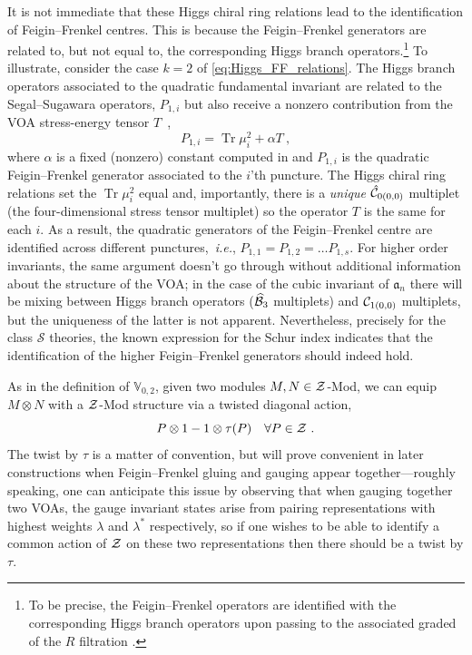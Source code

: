 \documentclass[a4paper]{article}
\def\IV{\mathbb{V}}
\def\BB{{\cal B}}
\def\CC{{\cal C}}
\def\ZZ{{\cal Z}}
\def\Tr{\mathop{\mathrm{Tr}}\nolimits}
\def\af{\mathfrak{a}}
\def \ie{{\it i.e.}}
\begin{document}
It is not immediate that these Higgs chiral ring relations lead to the identification of Feigin--Frenkel centres. This is because the Feigin--Frenkel generators are related to, but not equal to, the corresponding Higgs branch operators.\footnote{To be precise, the Feigin--Frenkel operators are identified with the corresponding Higgs branch operators upon passing to the associated graded of the $R$ filtration \cite{Beem:2017ooy}.} To illustrate, consider the case $k=2$ of \eqref{eq:Higgs_FF_relations}. The Higgs branch operators associated to the quadratic fundamental invariant are related to the Segal--Sugawara operators, $P_{1,i}$ but also receive a nonzero contribution from the VOA stress-energy tensor $T$~\cite{Beem:2018duj},
\begin{equation}
	P_{1,i}= \Tr \mu^2_i  + \alpha T~,
\end{equation}
where $\alpha$ is a fixed (nonzero) constant computed in \cite{Beem:2018duj} and $P_{1,i}$ is the quadratic Feigin--Frenkel generator associated to the $i$'th puncture. The Higgs chiral ring relations set the $\Tr \mu^2_i$ equal and, importantly, there is a \emph{unique} $\hat{\CC}_{0(0,0)}$ multiplet (the four-dimensional stress tensor multiplet) so the operator $T$ is the same for each $i$. As a result, the quadratic generators of the Feigin--Frenkel centre are identified across different punctures,~\ie, $P_{1,1}=P_{1,2}=\dots P_{1,s}$. For higher order invariants, the same argument doesn't go through without additional information about the structure of the VOA; in the case of the cubic invariant of $\af_n$ there will be mixing between Higgs branch operators ($\widehat\BB_3$ multiplets) and $\CC_{1(0,0)}$ multiplets, but the uniqueness of the latter is not apparent. Nevertheless, precisely for the class $\mathcal{S}$ theories, the known expression for the Schur index indicates that the identification of the higher Feigin--Frenkel generators should indeed hold.

As in the definition of $\IV_{0,2}$, given two modules $M,N\in\ZZ$-Mod, we can equip $M\otimes N$ with a $\ZZ$-Mod structure via a twisted diagonal action,
\begin{equation}
	P\otimes1 - 1\otimes\tau(P)\quad \forall P\in\ZZ~.
\end{equation}
The twist by $\tau$ is a matter of convention, but will prove convenient in later constructions when Feigin--Frenkel gluing and gauging appear together---roughly speaking, one can anticipate this issue by observing that when gauging together two VOAs, the gauge invariant states arise from pairing representations with highest weights $\lambda$ and $\lambda^*$ respectively, so if one wishes to be able to identify a common action of $\ZZ$ on these two representations then there should be a twist by $\tau$.
\end{document}
